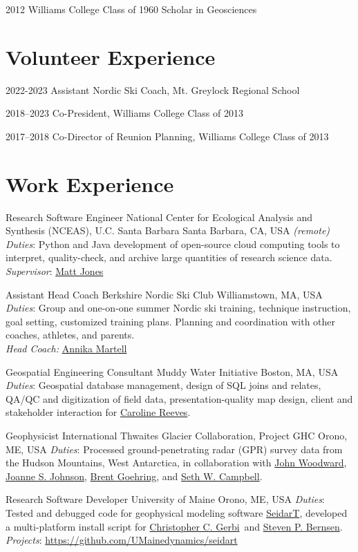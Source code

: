 \documentclass[a4paper,12pt,sans,colorlinks]{moderncv}
\newcommand{\seth}{\href{https://www.alpinesciences.net}{Seth W. Campbell}}
\newcommand{\stevebernsen}{\href{https://watc.alaska.edu/node/73}{Steven P. Bernsen}}
\newcommand{\chris}{\href{https://umaine.edu/earthclimate/people/christopher-gerbi/}{Christopher C. Gerbi}}
\newcommand{\mattjones}{\href{https://orcid.org/0000-0003-0077-4738}{Matt Jones}}
\newcommand{\johnwoodward}{\href{https://www.northumbria.ac.uk/about-us/our-staff/w/john-woodward}{John Woodward}}
\newcommand{\joannejohnson}{\href{https://www.bas.ac.uk/profile/jsj/}{Joanne S. Johnson}}
\newcommand{\brent}{\href{https://sse.tulane.edu/eens/faculty/goehring}{Brent Goehring}}
\newcommand{\caroline}{\href{https://www.muddywaterinitiative.org/leadership}{Caroline Reeves}}
\newcommand{\annika}{\href{https://ephsports.williams.edu/sports/mens-skiing/roster/coaches/annika-martell/525}{Annika Martell}}
\newcommand{\seidart}{\href{https://github.com/UMainedynamics/SeidarT}{SeidarT}}
\begin{document}
\cvline
{2012}
{Williams College Class of 1960 Scholar in Geosciences}


\section{Volunteer Experience}

\cvline
{2022-2023}
{Assistant Nordic Ski Coach, Mt. Greylock Regional School}

\cvline
{2018--2023}
{Co-President, Williams College Class of 2013}

\cvline
{2017--2018}
{Co-Director of Reunion Planning, Williams College Class of 2013}

\section{Work Experience}

{Research Software Engineer}
{National Center for Ecological Analysis and Synthesis (NCEAS),
U.C. Santa Barbara}
{Santa Barbara, CA, USA \emph{(remote)}}
{}
{
    \emph{Duties}: Python and Java development of open-source cloud computing
    tools to interpret, quality-check, and archive large quantities of research science data.
    \\
    \emph{Supervisor}: \mattjones
}

{Assistant Head Coach}
{Berkshire Nordic Ski Club}
{Williamstown, MA, USA}
{}
{
    \emph{Duties}: Group and one-on-one summer Nordic ski training, technique instruction, goal setting, customized training
    plans. Planning and coordination with other coaches, athletes, and parents.
    \\
    \emph{Head Coach:} \annika
}

{Geospatial Engineering Consultant}
{Muddy Water Initiative}
{Boston, MA, USA}
{}
{
    \emph{Duties}: Geospatial database management, design of SQL joins and
    relates, QA/QC and digitization of field data, presentation-quality map
    design, client and stakeholder interaction for \caroline.
}

{Geophysicist}
{International Thwaites Glacier Collaboration, Project GHC}
{Orono, ME, USA}
{}
{
    \emph{Duties}: Processed ground-penetrating radar (GPR) survey data
    from the Hudson Mountains, West Antarctica, in collaboration with
    \johnwoodward, \joannejohnson, \brent, and \seth.
}

{Research Software Developer}
{University of Maine}
{Orono, ME, USA}
{}
{
    \emph{Duties}: Tested and debugged code for geophysical modeling software
    \seidart, developed a multi-platform install script for \chris\ and
    \stevebernsen.
    \\
    \emph{Projects}: \url{https://github.com/UMainedynamics/seidart}
}
\end{document}
